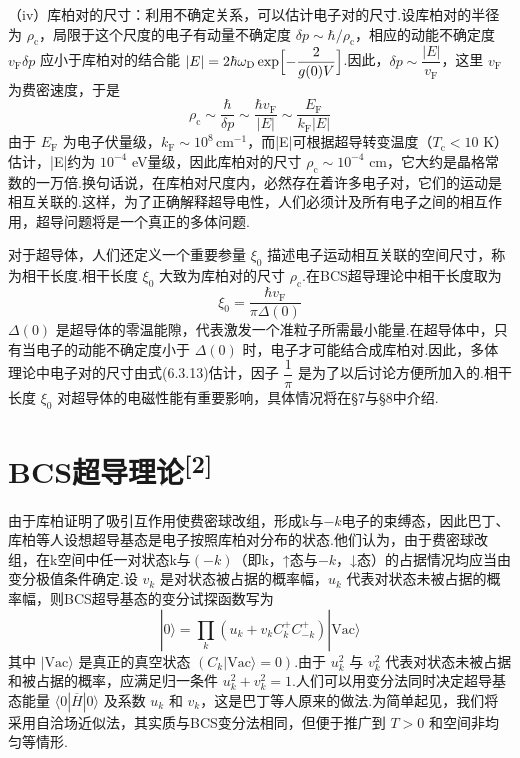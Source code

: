 （iv）库柏对的尺寸：利用不确定关系，可以估计电子对的尺寸.设库柏对的半径为 $\rho_{\mathrm{c}}$，局限于这个尺度的电子有动量不确定度 $\delta p\sim\hbar/\rho_{\mathrm{c}}$，相应的动能不确定度 $v_{\mathrm{F}}\delta p$ 应小于库柏对的结合能 $|E|=2\hbar\omega_{\mathrm{D}}\exp\Bigl[-\dfrac{2}{g(0)V}\Bigr]$.因此，$\delta p\sim\dfrac{|E|}{v_{\mathrm{F}}}$，这里 $v_{\mathrm{F}}$ 为费密速度，于是
\begin{equation}
  \rho_{\mathrm{c}}\sim\frac{\hbar}{\delta p}\sim\frac{\hbar v_{\mathrm{F}}}{|E|}
  \sim\frac{E_{\mathrm{F}}}{k_{\mathrm{F}}|E|}
\end{equation}
由于 $E_{\mathrm{F}}$ 为电子伏量级，$k_{\mathrm{F}}\sim10^{8}\,\mathrm{cm}^{-1}$，而|E|可根据超导转变温度（$T_{\mathrm{c}}<10$ K）估计，|E|约为 $10^{-4}$ eV量级，因此库柏对的尺寸 $\rho_{\mathrm{c}}\sim10^{-4}$ cm，它大约是晶格常数的一万倍.换句话说，在库柏对尺度内，必然存在着许多电子对，它们的运动是相互关联的.这样，为了正确解释超导电性，人们必须计及所有电子之间的相互作用，超导问题将是一个真正的多体问题.

对于超导体，人们还定义一个重要参量 $\xi_{0}$ 描述电子运动相互关联的空间尺寸，称为相干长度.相干长度 $\xi_{0}$ 大致为库柏对的尺寸 $\rho_{\mathrm{c}}$.在BCS超导理论中相干长度取为
\begin{equation}
  \xi_{0}=\frac{\hbar v_{\mathrm{F}}}{\pi\Delta(0)}
\end{equation}
$\Delta(0)$ 是超导体的零温能隙，代表激发一个准粒子所需最小能量.在超导体中，只有当电子的动能不确定度小于 $\Delta(0)$ 时，电子才可能结合成库柏对.因此，多体理论中电子对的尺寸由式(6.3.13)估计，因子 $\dfrac{1}{\pi}$ 是为了以后讨论方便所加入的.相干长度 $\xi_{0}$ 对超导体的电磁性能有重要影响，具体情况将在§7与§8中介绍.

\section{\texorpdfstring{BCS超导理论\textsuperscript{[2]}}{BCS超导理论[2]}}

由于库柏证明了吸引互作用使费密球改组，形成k与$-k$电子的束缚态，因此巴丁、库柏等人设想超导基态是电子按照库柏对分布的状态.他们认为，由于费密球改组，在k空间中任一对状态k与$(-k)$（即k，↑态与$-k$，↓态）的占据情况均应当由变分极值条件确定.设 $v_{k}$ 是对状态被占据的概率幅，$u_{k}$ 代表对状态未被占据的概率幅，则BCS超导基态的变分试探函数写为
\begin{equation}
  |0\rangle=\prod_{k}\left(u_{k}+v_{k}C^{+}_{k}C^{+}_{-k}\right)|\mathrm{Vac}\rangle
\end{equation}
其中 $|\mathrm{Vac}\rangle$ 是真正的真空状态 $\left(C_{k}|\mathrm{Vac}\rangle=0\right)$.由于 $u_{k}^{2}$ 与 $v_{k}^{2}$ 代表对状态未被占据和被占据的概率，应满足归一条件 $u_{k}^{2}+v_{k}^{2}=1$.人们可以用变分法同时决定超导基态能量 $\langle0|\overline{H}|0\rangle$ 及系数 $u_{k}$ 和 $v_{k}$，这是巴丁等人原来的做法.为简单起见，我们将采用自洽场近似法，其实质与BCS变分法相同，但便于推广到 $T>0$ 和空间非均匀等情形.

